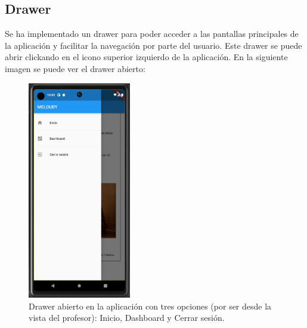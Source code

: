 \subsection{Drawer}
Se ha implementado un drawer para poder acceder a las pantallas principales de la aplicación y facilitar la navegación por parte del usuario. Este drawer se puede abrir clickando en el icono superior izquierdo de la aplicación. En la siguiente imagen se puede ver el drawer abierto:

\begin{figure}[H]
    \centering
    \includegraphics[width=0.4\textwidth]{imagenes/c7/drawer.png}
    \caption{Drawer abierto en la aplicación con tres opciones (por ser desde la vista del profesor): Inicio, Dashboard y Cerrar sesión.}
    \label{fig:login}
\end{figure}


